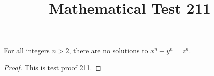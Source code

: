 \documentclass{amsart}
\begin{document}
\title{Mathematical Test 211}
\begin{theorem}
For all integers $n > 2$, there are no solutions to $x^n + y^n = z^n$.
\end{theorem}
\begin{proof}
This is test proof 211.
\end{proof}
\end{document}
